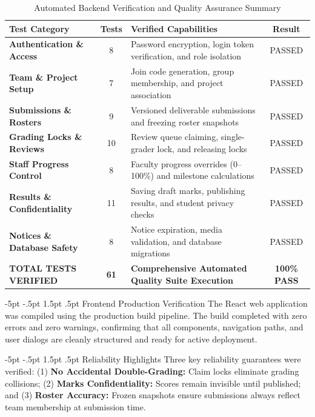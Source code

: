 \documentclass[11pt,a4paper]{article}
\makeatletter
\renewcommand\subsection{\@startsection{subsection}{2}{\z@}%
  {-5pt \@plus -1pt \@minus -.5pt}%
  {1.5pt \@plus .5pt}%
  {\normalfont\normalsize\bfseries\color{nexaSlate}}}
\makeatother
\begin{document}
\begin{table}[htbp]
\centering
\small
\caption{Automated Backend Verification and Quality Assurance Summary}
\label{tab:testing}
\vspace{0.15cm}
\begin{tabularx}{\textwidth}{|l|c|X|c|}
\hline\hline
\textbf{Test Category} & \textbf{Tests} & \textbf{Verified Capabilities} & \textbf{Result} \\
\hline\hline
\textbf{Authentication \& Access} & 8 & Password encryption, login token verification, and role isolation & PASSED \\
\hline
\textbf{Team \& Project Setup} & 7 & Join code generation, group membership, and project association & PASSED \\
\hline
\textbf{Submissions \& Rosters} & 9 & Versioned deliverable submissions and freezing roster snapshots & PASSED \\
\hline
\textbf{Grading Locks \& Reviews} & 10 & Review queue claiming, single-grader lock, and releasing locks & PASSED \\
\hline
\textbf{Staff Progress Control} & 8 & Faculty progress overrides (0--100\%) and milestone calculations & PASSED \\
\hline
\textbf{Results \& Confidentiality} & 11 & Saving draft marks, publishing results, and student privacy checks & PASSED \\
\hline
\textbf{Notices \& Database Safety} & 8 & Notice expiration, media validation, and database migrations & PASSED \\
\hline\hline
\textbf{TOTAL TESTS VERIFIED} & \textbf{61} & \textbf{Comprehensive Automated Quality Suite Execution} & \textbf{100\% PASS} \\
\hline\hline
\end{tabularx}
\end{table}

\subsection{Frontend Production Verification}
The React web application was compiled using the production build pipeline. The build completed with zero errors and zero warnings, confirming that all components, navigation paths, and user dialogs are cleanly structured and ready for active deployment.

\subsection{Reliability Highlights}
Three key reliability guarantees were verified: (1) \textbf{No Accidental Double-Grading:} Claim locks eliminate grading collisions; (2) \textbf{Marks Confidentiality:} Scores remain invisible until published; and (3) \textbf{Roster Accuracy:} Frozen snapshots ensure submissions always reflect team membership at submission time.
\end{document}
